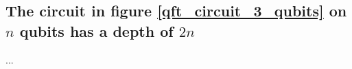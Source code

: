 \subsection*{The circuit in figure \ref{qft_circuit_3_qubits} on $n$ qubits has a depth of $2n$}
...







